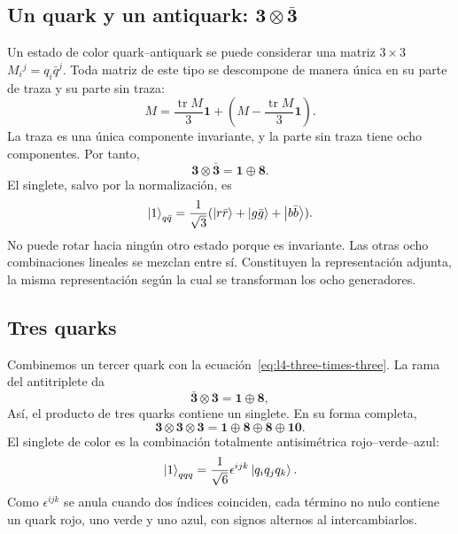 \subsection{Un quark y un antiquark: \texorpdfstring{\(\boldsymbol 3\otimes\bar{\boldsymbol 3}\)}{3 x anti-3}}

Un estado de color quark--antiquark se puede considerar una matriz \(3\times3\) \(M_i{}^j=q_i\bar q^j\). Toda matriz de este tipo se descompone de manera única en su parte de traza y su parte sin traza:
\begin{equation}
M=\frac{\operatorname{tr}M}{3}\boldsymbol 1
+\left(M-\frac{\operatorname{tr}M}{3}\boldsymbol 1\right).
\end{equation}
La traza es una única componente invariante, y la parte sin traza tiene ocho componentes. Por tanto,
\begin{equation}
\boldsymbol 3\otimes\bar{\boldsymbol 3}
=\boldsymbol 1\oplus\boldsymbol 8.
\label{eq:l4-three-times-threebar}
\end{equation}
El singlete, salvo por la normalización, es
\begin{equation}
\left\lvert1\right\rangle_{q\bar q}
=\frac{1}{\sqrt3}
(\left\lvert r\bar r\right\rangle+\left\lvert g\bar g\right\rangle+\left\lvert b\bar b\right\rangle).
\end{equation}
No puede rotar hacia ningún otro estado porque es invariante. Las otras ocho combinaciones lineales se mezclan entre sí. Constituyen la representación adjunta, la misma representación según la cual se transforman los ocho generadores.

\subsection{Tres quarks}

Combinemos un tercer quark con la ecuación~\eqref{eq:l4-three-times-three}. La rama del antitriplete da
\begin{equation}
\bar{\boldsymbol 3}\otimes\boldsymbol 3
=\boldsymbol 1\oplus\boldsymbol 8,
\end{equation}
Así, el producto de tres quarks contiene un singlete. En su forma completa,
\begin{equation}
\boldsymbol 3\otimes\boldsymbol 3\otimes\boldsymbol 3
=\boldsymbol 1\oplus\boldsymbol 8\oplus\boldsymbol 8
\oplus\boldsymbol{10}.
\label{eq:l4-three-quark-full}
\end{equation}
El singlete de color es la combinación totalmente antisimétrica rojo--verde--azul:
\begin{equation}
\left\lvert1\right\rangle_{qqq}
=\frac{1}{\sqrt6}\epsilon^{ijk}\left\lvert q_iq_jq_k\right\rangle.
\label{eq:l4-baryon-singlet}
\end{equation}
Como \(\epsilon^{ijk}\) se anula cuando dos índices coinciden, cada término no nulo contiene un quark rojo, uno verde y uno azul, con signos alternos al intercambiarlos.

